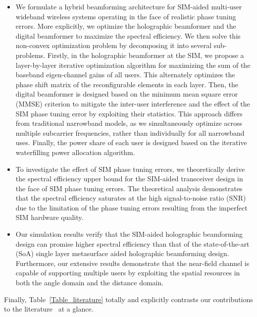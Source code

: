 \documentclass[lettersize,journal]{IEEEtran}
\theoremstyle{remark}
\begin{document}
\begin{itemize}
  \item We formulate a hybrid beamforming architecture for SIM-aided multi-user wideband wireless systems operating in the face of realistic phase tuning errors. More explicitly, we optimize the holographic beamformer and the digital beamformer to maximize the spectral efficiency. We then solve this non-convex optimization problem by decomposing it into several sub-problems. Firstly, in the holographic beamformer at the SIM, we propose a layer-by-layer iterative optimization algorithm for maximizing the sum of the baseband eigen-channel gains of all users. This alternately optimizes the phase shift matrix of the reconfigurable elements in each layer. Then, the digital beamformer is designed based on the minimum mean square error (MMSE) criterion to mitigate the inter-user interference and the effect of the SIM phase tuning error by exploiting their statistics. This approach differs from traditional narrowband models, as we simultaneously optimize across multiple subcarrier frequencies, rather than individually for all narrowband uses. Finally, the power share of each user is designed based on the iterative waterfilling power allocation algorithm.
  \item To investigate the effect of SIM phase tuning errors, we theoretically derive the spectral efficiency upper bound for the SIM-aided transceiver design in the face of SIM phase tuning errors. The theoretical analysis demonstrates that the spectral efficiency saturates at the high signal-to-noise ratio (SNR) due to the limitation of the phase tuning errors resulting from the imperfect SIM hardware quality.
  \item Our simulation results verify that the SIM-aided holographic beamforming design can promise higher spectral efficiency than that of the state-of-the-art (SoA) single layer metasurface aided holographic beamforming design. Furthermore, our extensive results demonstrate that the near-field channel is capable of supporting multiple users by exploiting the spatial resources in both the angle domain and the distance domain.
\end{itemize}

Finally, Table~\ref{Table_literature} totally and explicitly contrasts our contributions to the literature~\cite{deng2021reconfigurable_tvt,deng2022hdma,deng2022reconfigurable_twc,
hu2022holographic,deng2022holographic,hu2023holographic,wu2024two,shlezinger2019dynamic,
you2022energy,li2023near,an2023stacked,an2023stacked_icc,lin2024stacked} at a glance.
\end{document}
